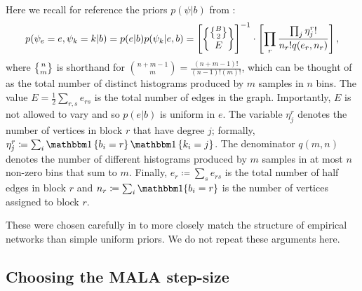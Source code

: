 Here we recall for reference
the priors $p(\psi | b)$ from \cite{Peixoto-Bayesian-Microcanonical}:
%
\begin{equation}
	p(\psi_e=e, \psi_k=k | b) = p(e | b) p(\psi_k | e, b) = \left[ \specialchoose{ \specialchoose{B}{2} }{ E} \right]^{-1} 
	\cdot \left[ \prod_r \frac{\prod_j \eta_j^r !}{n_r! q(e_r, n_r)} \right],
\end{equation}
%
where $\specialchoose{n}{m}$ is shorthand 
for $\binom{n+m-1}{m} = \frac{(n+m-1)!}{(n-1)!(m)!}$,
which can be thought of as the total number of distinct histograms 
produced by $m$ samples in $n$ bins.
The value
$E = \frac{1}{2} \sum_{r,s} e_{rs}$ is the total number of edges in the graph. 
Importantly, $E$ is not allowed to vary and so $p(e|b)$ is uniform in $e$.
The variable $\eta_j^r$ denotes the number of vertices in block $r$ 
that have degree $j$; formally, $\eta_j^r \coloneqq \sum_{i} \one\left\{b_i = r \right\} \one \left\{k_i = j \right\}$. 
The denominator $q(m, n)$ denotes the number of different histograms 
produced by $m$ samples in 
at most $n$ non-zero bins that sum to $m$. 
Finally, $e_r \coloneqq \sum_{s} e_{rs}$ is the total number 
of half edges in block $r$ and $n_r \coloneqq \sum_{i} \one\{b_i = r\}$ 
is the number of vertices assigned to block $r$. 

These were chosen carefully in \cite{Peixoto-Bayesian-Microcanonical} to 
more closely match the structure of empirical networks than simple 
uniform priors. We do not repeat these arguments here.

\subsection{Choosing the MALA step-size}
\label{appdx:step-size}

